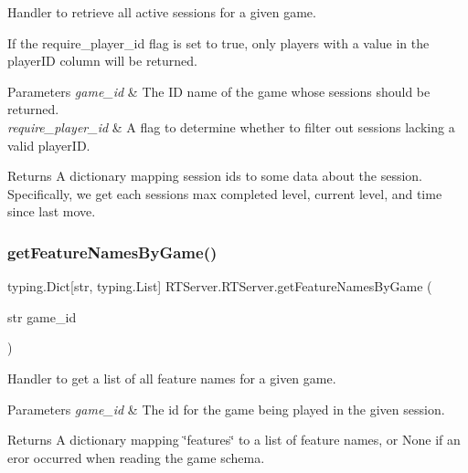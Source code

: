 Handler to retrieve all active sessions for a given game. 

If the require\+\_\+player\+\_\+id flag is set to true, only players with a value in the player\+ID column will be returned. 
\begin{DoxyParams}{Parameters}
{\em game\+\_\+id} & The ID name of the game whose sessions should be returned. \\
\hline
{\em require\+\_\+player\+\_\+id} & A flag to determine whether to filter out sessions lacking a valid player\+ID. \\
\hline
\end{DoxyParams}
\begin{DoxyReturn}{Returns}
A dictionary mapping session ids to some data about the session. Specifically, we get each session\textquotesingle{}s max completed level, current level, and time since last move. 
\end{DoxyReturn}
\mbox{\label{class_r_t_server_1_1_r_t_server_aa1154804acf028df8741b5ff5282458c}} 
\subsubsection{\texorpdfstring{getFeatureNamesByGame()}{getFeatureNamesByGame()}}
{\footnotesize\ttfamily  typing.\+Dict\mbox{[}str, typing.\+List\mbox{]} R\+T\+Server.\+R\+T\+Server.\+get\+Feature\+Names\+By\+Game (\begin{DoxyParamCaption}\item[{str}]{game\+\_\+id }\end{DoxyParamCaption})\hspace{0.3cm}{\ttfamily [static]}}



Handler to get a list of all feature names for a given game. 


\begin{DoxyParams}{Parameters}
{\em game\+\_\+id} & The id for the game being played in the given session. \\
\hline
\end{DoxyParams}
\begin{DoxyReturn}{Returns}
A dictionary mapping \char`\"{}features\char`\"{} to a list of feature names, or None if an eror occurred when reading the game schema. 
\end{DoxyReturn}
\mbox{\label{class_r_t_server_1_1_r_t_server_a293c91396d24ffed4891b61337856373}} 
